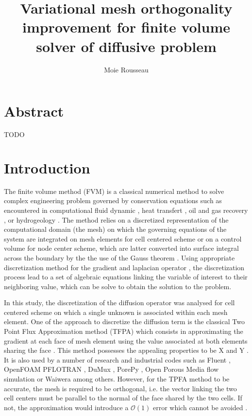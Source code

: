 \documentclass[11pt]{article}
\title{\textbf{Variational mesh orthogonality improvement for finite volume solver of diffusive problem}}
\author{Moie Rousseau}
\date{}
\begin{document}
\maketitle
\thispagestyle{empty}

\section*{Abstract}

TODO

\section{Introduction}


The finite volume method (FVM) is a classical numerical method to solve complex engineering problem governed by conservation equations such as encountered in computational fluid dynamic \cite{}, heat transfert \cite{}, oil and gas recovery \cite{}, or hydrogeology \cite{}.
The method relies on a discretized representation of the computational domain (the mesh) on which the governing equations of the system are integrated on mesh elements for cell centered scheme or on a control volume for node center scheme, which are latter converted into surface integral across the boundary by the the use of the Gauss theorem \cite{}. %
Using appropriate discretization method for the gradient and laplacian operator \cite{}, the discretization process lead to a set of algebraic equations linking the variable of interest to their neighboring value, which can be solve to obtain the solution to the problem.

In this study, the discretization of the diffusion operator was analysed for cell centered scheme on which a single unknown is associated within each mesh element.
One of the approach to discretize the diffusion term is the classical Two Point Flux Approximation method (TFPA) which consists in approximating the gradient at each face of mesh element using the value associated at both elements sharing the face \cite{moukalled_finite_2016, ferziger_computational_2020}.
This method possesses the appealing properties to be X and Y \cite{}. %
It is also used by a number of research and industrial codes such as Fluent \cite{}, OpenFOAM \cite{} PFLOTRAN \cite{hammond_pflotran_2012}, DuMux \cite{koch_dumux_2021}, PorePy \cite{keilegavlen_porepy_2021}, Open Porous Media flow simulation \cite{rasmussen_the_2021} or Waiwera \cite{} among others. %
However, for the TPFA method to be accurate, the mesh is required to be orthogonal, i.e. the vector linking the two cell centers must be parallel to the normal of the face shared by the two cells.
If not, the approximation would introduce a $\mathcal{O}(1)$ error which cannot be avoided \cite{}.
\end{document}
